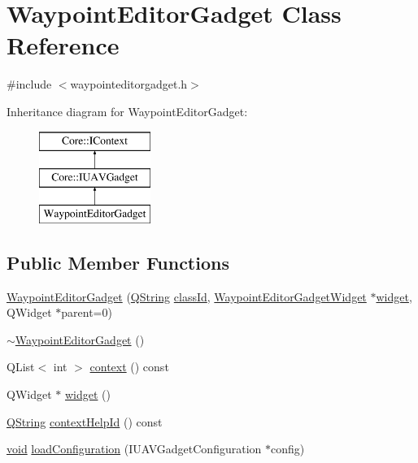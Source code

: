 \hypertarget{class_waypoint_editor_gadget}{\section{\-Waypoint\-Editor\-Gadget \-Class \-Reference}
\label{class_waypoint_editor_gadget}
}


{\ttfamily \#include $<$waypointeditorgadget.\-h$>$}

\-Inheritance diagram for \-Waypoint\-Editor\-Gadget\-:\begin{figure}[H]
\begin{center}
\leavevmode
\includegraphics[height=3.000000cm]{class_waypoint_editor_gadget}
\end{center}
\end{figure}
\subsection*{\-Public \-Member \-Functions}
\begin{DoxyCompactItemize}
\item 
\hyperlink{group___waypoint_editor_gadget_plugin_gafb34f259f81e6e7a200d84a3b955734f}{\-Waypoint\-Editor\-Gadget} (\hyperlink{group___u_a_v_objects_plugin_gab9d252f49c333c94a72f97ce3105a32d}{\-Q\-String} \hyperlink{group___core_plugin_ga3878fde66a57220608960bcc3fbeef2c}{class\-Id}, \hyperlink{class_waypoint_editor_gadget_widget}{\-Waypoint\-Editor\-Gadget\-Widget} $\ast$\hyperlink{group___waypoint_editor_gadget_plugin_ga5c05d17087d355a8f6a0c428c89ccb09}{widget}, \-Q\-Widget $\ast$parent=0)
\item 
\hyperlink{group___waypoint_editor_gadget_plugin_ga3cdba64c9d39d71291529e2929a63552}{$\sim$\-Waypoint\-Editor\-Gadget} ()
\item 
\-Q\-List$<$ int $>$ \hyperlink{group___waypoint_editor_gadget_plugin_ga90adc26647456b7dcb4bfc8fb0fb80d1}{context} () const 
\item 
\-Q\-Widget $\ast$ \hyperlink{group___waypoint_editor_gadget_plugin_ga5c05d17087d355a8f6a0c428c89ccb09}{widget} ()
\item 
\hyperlink{group___u_a_v_objects_plugin_gab9d252f49c333c94a72f97ce3105a32d}{\-Q\-String} \hyperlink{group___waypoint_editor_gadget_plugin_ga9aa5c62f07b81e2a3e782fe2581e7a9d}{context\-Help\-Id} () const 
\item 
\hyperlink{group___u_a_v_objects_plugin_ga444cf2ff3f0ecbe028adce838d373f5c}{void} \hyperlink{group___waypoint_editor_gadget_plugin_ga14051e5dfbb5586837f5a4c092d4ef4c}{load\-Configuration} (\-I\-U\-A\-V\-Gadget\-Configuration $\ast$config)
\end{DoxyCompactItemize}


